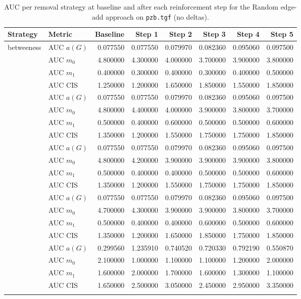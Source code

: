 \begin{table}[htbp]
  \centering
  \caption{AUC per removal strategy at baseline and after each reinforcement step for the Random edge-add approach on \texttt{pzb.tgf} (no deltas).}
  \label{tab:pzb-random_add-auc}
  \begin{tabular}{llrrrrrr}
    \toprule
    \textbf{Strategy} & \textbf{Metric} & \textbf{Baseline} & \textbf{Step 1} & \textbf{Step 2} & \textbf{Step 3} & \textbf{Step 4} & \textbf{Step 5} \\
    \midrule
    \multirow{4}{*}{betweeness} & AUC $a(G)$ & 0.077550 & 0.077550 & 0.079970 & 0.082360 & 0.095060 & 0.097500 \\
    & AUC $m_0$ & 4.800000 & 4.300000 & 4.000000 & 3.700000 & 3.900000 & 3.800000 \\
    & AUC $m_1$ & 0.400000 & 0.300000 & 0.400000 & 0.300000 & 0.400000 & 0.500000 \\
    & AUC CIS & 1.250000 & 1.200000 & 1.650000 & 1.850000 & 1.550000 & 1.850000 \\
    \addlinespace
    \multirow{4}{*}{closeness} & AUC $a(G)$ & 0.077550 & 0.077550 & 0.079970 & 0.082360 & 0.095060 & 0.097500 \\
    & AUC $m_0$ & 4.800000 & 4.400000 & 4.000000 & 3.900000 & 3.800000 & 3.700000 \\
    & AUC $m_1$ & 0.500000 & 0.400000 & 0.600000 & 0.500000 & 0.500000 & 0.600000 \\
    & AUC CIS & 1.350000 & 1.200000 & 1.550000 & 1.750000 & 1.750000 & 1.850000 \\
    \addlinespace
    \multirow{4}{*}{core influence} & AUC $a(G)$ & 0.077550 & 0.077550 & 0.079970 & 0.082360 & 0.095060 & 0.097500 \\
    & AUC $m_0$ & 4.800000 & 4.200000 & 3.900000 & 3.900000 & 3.900000 & 3.800000 \\
    & AUC $m_1$ & 0.500000 & 0.400000 & 0.400000 & 0.500000 & 0.500000 & 0.600000 \\
    & AUC CIS & 1.350000 & 1.200000 & 1.550000 & 1.750000 & 1.750000 & 1.850000 \\
    \addlinespace
    \multirow{4}{*}{degree} & AUC $a(G)$ & 0.077550 & 0.077550 & 0.079970 & 0.082360 & 0.095060 & 0.097500 \\
    & AUC $m_0$ & 4.700000 & 4.300000 & 3.900000 & 3.900000 & 3.800000 & 3.700000 \\
    & AUC $m_1$ & 0.500000 & 0.400000 & 0.400000 & 0.600000 & 0.500000 & 0.600000 \\
    & AUC CIS & 1.350000 & 1.200000 & 1.650000 & 1.850000 & 1.750000 & 1.850000 \\
    \addlinespace
    \multirow{4}{*}{random} & AUC $a(G)$ & 0.299560 & 1.235910 & 0.740520 & 0.720330 & 0.792190 & 0.550870 \\
    & AUC $m_0$ & 2.100000 & 1.000000 & 1.100000 & 1.100000 & 1.200000 & 2.000000 \\
    & AUC $m_1$ & 1.600000 & 2.000000 & 1.700000 & 1.600000 & 1.300000 & 1.100000 \\
    & AUC CIS & 1.650000 & 2.500000 & 3.050000 & 2.450000 & 2.950000 & 3.350000 \\
    \addlinespace
    \bottomrule
  \end{tabular}
\end{table}
